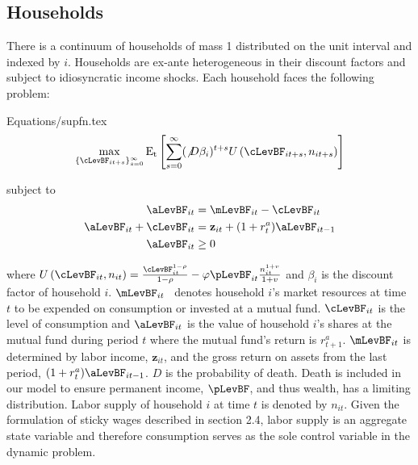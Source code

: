 \documentclass[titlepage]{\econtex}\providecommand{\texname}{FBS-NK}
\providecommand{\EqDir}{Equations}
\begin{document}
\subsection{Households}
\label{subsec:Households} 

There is a continuum of households of mass 1 distributed on the unit
interval and indexed by $i$. Households are ex-ante heterogeneous in their discount factors and subject to idiosyncratic income shocks.  Each household faces the following problem:

\begin{verbatimwrite}{\EqDir/supfn.tex}
\begin{eqnarray}
  \label{eq:supfn}
  \max_{\{\cLevBF_{it+s}\}_{s=0}^{\infty}} \mathrm{E_{t}}\left[\sum_{s=0}^{\infty} (\not D \beta_{i})^{t+s} U\left(  \cLevBF_{i t+s}, n_{i t+s}\right)\right]
\end{eqnarray}
\end{verbatimwrite}
 

subject to 
\begin{align*}
\aLevBF_{it}     &= \mLevBF_{it} - \cLevBF_{it}   \label{eq:DBCparts} \\
\aLevBF_{it} +\cLevBF_{it}    &= \mathbf{z}_{it} +   (1 + r^{a}_{t} ) \aLevBF_{it-1}   \\ 
\aLevBF_{it}  &\geq 0 \\
\end{align*}

where
$U\left(\cLevBF_{i t}, n_{i t}\right) = \frac{\cLevBF_{i t}^{1-\rho}}{1 -\rho} - \varphi \pLevBF_{it} \frac{n_{it}^{1+v}}{1+v}$  and $\beta_{i}$ is the discount factor of household $i$. $\mLevBF_{it}$ \ denotes household $i$'s market resources at time $t$ to be expended on consumption or invested at a mutual fund. $\cLevBF_{it}$ is the level of consumption and $ \aLevBF_{it}$ is the value of household $i$'s shares at the mutual fund during period $t$ where the mutual fund's return is $r_{t+1}^{a}$.  $\mLevBF_{it}$ is determined by labor income,  $\mathbf{z}_{it}$, and the gross return on assets from the last period, $(1+r_{t}^{a}) \aLevBF_{it-1} $. $D$ is the probability of death. Death is included in our model to ensure permanent income, $\pLevBF$, and thus wealth, has a limiting distribution.   Labor supply of household $i$ at time $t$ is denoted by $n_{it}$.  Given the formulation of sticky wages described in section 2.4, labor supply is an aggregate state variable and therefore consumption serves as the sole control variable in the dynamic problem.  \\
\end{document}
